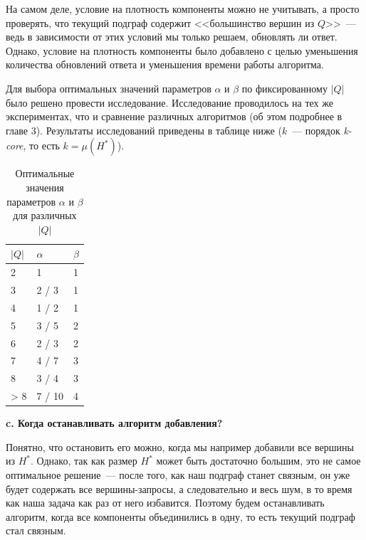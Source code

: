 \documentclass[11pt,a4paper,oneside]{article}
\begin{document}
На самом деле, условие на плотность компоненты можно не учитывать, а просто проверять, что текущий подграф содержит <<большинство вершин из $Q$>>~--- ведь в зависимости от этих условий мы только решаем, обновлять ли ответ. Однако, условие на плотность компоненты было добавлено с целью уменьшения количества обновлений ответа и уменьшения времени работы алгоритма.

Для выбора оптимальных значений параметров $\alpha$ и $\beta$ по фиксированному $|Q|$ было решено провести исследование. Исследование проводилось на тех же экспериментах, что и сравнение различных алгоритмов (об этом подробнее в главе $3$). Результаты исследований приведены в таблице ниже ($k$~--- порядок \textit{k-core}, то есть $k = \mu(H^*)$).

\begin{table}[!h]
\centering
\caption{Оптимальные значения параметров $\alpha$ и $\beta$ для различных $|Q|$}\label{parameters-research}
  \begin{tabular}{| l | l | p{1cm} |}
  \hline
  $|Q|$ & $\alpha$ & $\beta$ \\\hline
  2   & 1      & 1        \\\hline
  3   & 2 / 3  & 1        \\\hline
  4   & 1 / 2  & 1        \\\hline
  5   & 3 / 5  & 2        \\\hline
  6   & 2 / 3  & 2        \\\hline
  7   & 4 / 7  & 3        \\\hline
  8   & 3 / 4  & 3        \\\hline
  > 8 & 7 / 10 & 4        \\\hline
  \end{tabular}
\end{table}
\FloatBarrier

\textbf{c. Когда останавливать алгоритм добавления?}

Понятно, что остановить его можно, когда мы например добавили все вершины из $H^*$. Однако, так как размер $H^*$ может быть достаточно большим, это не самое оптимальное решение~--- после того, как наш подграф станет связным, он уже будет содержать все вершины-запросы, а следовательно и весь шум, в то время как наша задача как раз от него избавится. Поэтому будем останавливать алгоритм, когда все компоненты объединились в одну, то есть текущий подграф стал связным.
\end{document}
